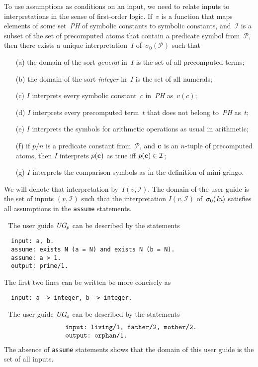 \documentclass{article}
\def\beq{\begin{equation}}
\def\eeq#1{\label{#1}\end{equation}}
\def\ba{\begin{array}}
\def\ea{\end{array}}
\def\gringo{{\sc gringo}}
\newcommand{\I}{\mathcal{I}}
\newcommand{\PP}{\mathcal{P}}
\begin{document}
To use assumptions as conditions on an input, we need to relate inputs
to interpretations in the sense of first-order logic.
If~$v$ is a function that maps elements of some set~\emph{PH} of
symbolic constants to symbolic constants, and~$\I$ is a subset of the set of
precomputed atoms that contain a predicate symbol from~$\PP$,
then there exists a unique interpretation~$I$ of~$\sigma_0(\PP)$ such that
\begin{itemize}
\item[(a)]
the domain of the sort \emph{general} in~$I$
  is the set of all precomputed terms;
\item[(b)]
the domain of the sort \emph{integer} in~$I$ is the set of all numerals;
\item[(c)] $I$ interprets every symbolic constant~$c$ in~\emph{PH}
  as~$v(c)$;
\item[(d)] $I$ interprets every precomputed term~$t$ that does not
  belong to~\emph{PH} as~$t$;
\item[(e)] $I$ interprets the symbols for arithmetic operations
  as usual in arithmetic;
\item[(f)] if $p/n$ is a predicate constant from~$\PP$, and $\bf c$
  is an $n$-tuple of precomputed atoms, then $I$ interprets
  $p({\bf c})$ as true iff $p({\bf c})\in\I$;
\item[(g)] $I$ interprets the comparison symbols as in the definition of
  mini-\gringo.
\end{itemize}
We will denote that interpretation by~$I(v,\I)$.
The domain of the user guide is the set of inputs $(v,\I)$ such that
the interpretation $I(v,\I)$ of~$\sigma_0(\emph{In})$ satisfies all
assumptions in the \verb|assume| statements.

\medskip{}$\;$ The user guide $\emph{UG}_p$
can be described by the statements
\begin{verbatim}
  input: a, b.
  assume: exists N (a = N) and exists N (b = N).
  assume: a > 1.
  output: prime/1.
\end{verbatim}
The first two lines can be written be more concisely as
\begin{verbatim}
  input: a -> integer, b -> integer.
\end{verbatim}

\medskip{}$\;$ The user guide $\emph{UG}_o$
can be described by the statements
\beq\ba l
\verb| input: living/1, father/2, mother/2.|\\
\verb| output: orphan/1.|
\ea\eeq{ugo}
The absence of \verb|assume| statements shows that the domain of this
user guide is the set of all inputs.
\end{document}
